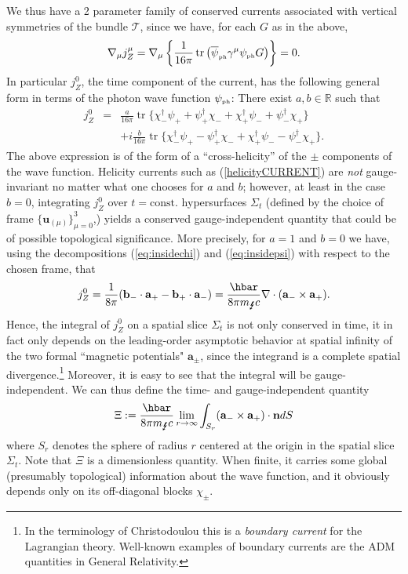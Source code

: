 \documentclass[11pt]{article}
\theoremstyle{definition}
\DeclareMathOperator{\tr}{tr}
\newcommand{\refeq}[1]{(\ref{#1})}
\numberwithin{equation}{section}
\newcommand{\bb}{\mathbf{b}}
\newcommand{\ba}{\mathbf{a}}
\newcommand{\bn}{\mathbf{n}}
\newcommand{\bu}{\mathbf{u}}
\newcommand{\beq}{\begin{equation}}
\newcommand{\eeq}{\end{equation}}
\newcommand{\cT}{\mathcal{T}}
\newcommand{\psiPH}{{\psi_{\mbox{\rm\tiny ph}}}}
\newcommand{\psiPHb}{{\overline\psi_{\mbox{\rm\tiny ph}}}}
\newcommand{\mPH}{{m_{\mbox{\Lightning}}}}
\newcommand{\Rset}{{\mathbb R}}
\newcommand{\ga}{\gamma}
\newcommand{\Si}{\Sigma}
\newcommand{\nab}{\nabla}
\newcommand{\bna}{\begin{eqnarray}}
\newcommand{\ena}{\end{eqnarray}}
\begin{document}
We thus have a 2 parameter family of conserved currents associated with vertical symmetries of the bundle $\cT$, since we have, for
 each $G$ as in the above,
\beq 
\nab_\mu j_Z^\mu = \nab_\mu \left\{ \frac{1}{16 \pi}\tr\left( \psiPHb \ga^\mu \psiPH G \right) \right\} = 0.
\eeq
 In particular $j_Z^0$, the time component of the current, has the following general form in terms of the photon wave function $\psiPH$:
 There exist  $a,b\in \Rset$ such that 
\bna\label{nongaugeconslaw}
j_Z^0 & = &  \frac{a}{16 \pi} \tr \{ \chi_-^\dag \psi_+ +\psi_+^\dag \chi_- + \chi_+^\dag \psi_- + \psi_-^\dag \chi_+ \} \\
& &+  i\frac{b}{16 \pi} \tr \{ \chi_-^\dag \psi_+ - \psi_+^\dag \chi_- + \chi_+^\dag \psi_- -\psi_-^\dag\chi_+\}.
\ena
 The above expression is of the form of a ``cross-helicity'' of the $\pm$ components of the wave function.
 Helicity currents such as \refeq{helicityCURRENT} are {\em not} gauge-invariant no matter what one chooses for $a$ and $b$;
however, at least in the case $b=0$, integrating $j_Z^0$ over $t=  \mbox{const.}$ hypersurfaces $\Si_t$ (defined by the choice 
of frame $\{\bu_{(\mu)}\}_{\mu = 0}^3$,)  yields a conserved gauge-independent quantity that could be of possible topological significance. 
More precisely, for $a=1$ and $b=0$ we have, using the decompositions \refeq{eq:insidechi} and \refeq{eq:insidepsi} with respect to the chosen 
frame, that
\beq
j_Z^0  =  \frac{1}{8 \pi} (\bb_- \cdot \ba_+ - \bb_+ \cdot \ba_-) = \frac{\hbar}{8 \pi \mPH c}\nab\cdot (\ba_- \times \ba_+).
\eeq
Hence, the integral of $j_Z^0$ on a spatial slice $\Si_t$ is not only conserved in time, it in fact only depends on the leading-order 
asymptotic behavior at spatial infinity of the two formal ``magnetic potentials" $\ba_\pm$, since the integrand is a complete spatial 
divergence.\footnote{In the terminology of Christodoulou \cite{Chr2000} this is a {\em boundary current} for the Lagrangian theory. 
 Well-known examples of boundary currents are the ADM quantities in General Relativity.} 
 Moreover, it is easy to see that the integral will be gauge-independent. 
We can thus define the time- and gauge-independent quantity
\beq
\Xi := \frac{\hbar}{8 \pi \mPH c}\lim_{r\to \infty} \int_{S_r} (\ba_- \times\ba_+)\cdot \bn dS
\eeq
where $S_r$ denotes the sphere of radius $r$ centered at the origin in the spatial slice $\Si_t$. 
 Note that $\Xi$ is a dimensionless quantity.
 When finite, it carries some global (presumably topological)
information about the wave function, and it obviously depends only on its off-diagonal blocks $\chi_\pm$. 
\end{document}
